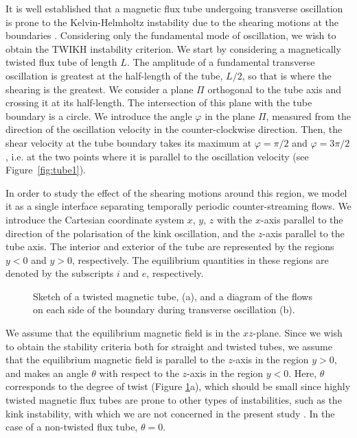 \documentclass[12pt]{ociamthesis}
\begin{document}
It is well established that a magnetic flux tube undergoing transverse oscillation is prone to the Kelvin-Helmholtz instability due to the shearing motions at the boundaries \citep{Terradas2008}.
Considering only the fundamental mode of oscillation, we wish to obtain the TWIKH instability criterion. We start by considering a magnetically twisted flux tube of length $L$.
The amplitude of a fundamental transverse oscillation is greatest at the half-length of the tube, $L/2$, so that is where the shearing is the greatest.
We consider a plane $\Pi$ orthogonal to the tube axis and crossing it at its half-length. The intersection of this plane with the tube boundary is a circle.
We introduce the angle $\varphi$ in the plane $\Pi$, measured from the direction of the oscillation velocity in the counter-clockwise direction.
Then, the shear velocity at the tube boundary takes its maximum at $\varphi = \pi/2$ and $\varphi = 3\pi/2$\/, i.e. at the two points where it is parallel to the oscillation velocity (see Figure~\ref{fig:tube1}).

In order to study the effect of the shearing motions around this region, we model it as a single interface separating temporally periodic counter-streaming flows.
We introduce the Cartesian coordinate system $x$, $y$, $z$ with the $x$\/-axis parallel to the direction of the polarisation of the kink oscillation, and the $z$\/-axis parallel to the tube axis.
The interior and exterior of the tube are represented by the regions $y < 0$ and $y > 0$, respectively.
The equilibrium quantities in these regions are denoted by the subscripts $i$ and $e$\/, respectively.

\begin{figure}[t]
\centering
{}
\hfill
{}
\caption{Sketch of a twisted magnetic tube, (a), and a diagram of the flows on each side of the boundary during transverse oscillation (b).}
\label{fig:tube_interface}
\end{figure}

We assume that the equilibrium magnetic field is in the $xz$\/-plane.
Since we wish to obtain the stability criteria both for straight and twisted tubes, we assume that the equilibrium magnetic field is parallel to the $z$-axis in the region $y > 0$, and makes an angle $\theta$ with respect to the $z$-axis in the region $y < 0$.
Here, $\theta$ corresponds to the degree of twist (Figure \ref{fig:tube_interface}a), which should be small since highly twisted magnetic flux tubes are prone to other types of instabilities, such as the kink instability, with which we are not concerned in the present study \citep[e.g.][]{Shafranov1958, Kruskal1958, Hood1979}.
In the case of a non-twisted flux tube, $\theta = 0$.
\end{document}

